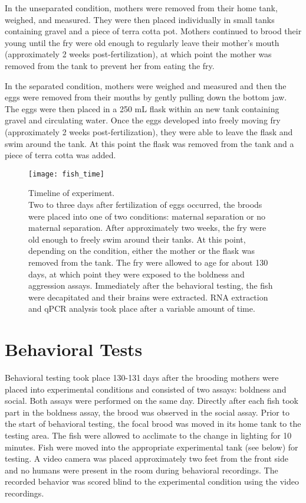 \documentclass[12pt,twoside]{reedthesis}
\begin{document}
In the unseparated condition, mothers were removed from their home tank,
weighed, and measured. They were then placed individually in small tanks containing gravel
and a piece of terra cotta pot. Mothers continued to brood their young until the
fry were old enough to regularly leave their mother's mouth (approximately 2 weeks post-fertilization), at which point the mother was removed from the tank to prevent her from eating the fry. 

In the separated condition, mothers were weighed and measured and then the eggs
were removed from their mouths by gently pulling down the bottom
jaw. The eggs were then placed in a 250 mL flask within an new tank containing
gravel and circulating water. Once
the eggs developed into freely moving fry (approximately 2 weeks
post-fertilization), they were able to leave the flask and swim around the tank.
At this point the flask was removed from the tank and a piece of terra cotta was added.

\begin{figure}[htbp] 
\begin{centering} 
\texttt{[image: fish\_time]}
\caption[Timeline of experiment]{\footnotesize{Timeline of experiment.\\ Two to
    three days after fertilization of eggs occurred, the broods were placed into
  one of two conditions: maternal separation or no maternal separation. After
  approximately two weeks, the fry were old enough to freely swim around their
  tanks. At this point, depending on the condition, either the mother or the
  flask was removed from the tank. The fry were allowed to age for about 130
  days, at which point they were exposed to the boldness and aggression assays.
  Immediately after the behavioral testing, the fish were decapitated and their
  brains were extracted. RNA extraction and qPCR analysis took place after a variable
  amount of time.}} 
\label{subd}
\end{centering} 
\end{figure}

\section{Behavioral Tests}

Behavioral testing took place 130-131 days after the brooding mothers were
placed into experimental conditions and consisted of two assays: boldness and social. Both assays were performed on the same day.
Directly after each fish took part in the boldness assay, the brood was observed in the
social assay.
Prior to the start of behavioral testing, the focal brood was moved in its home tank to the
testing area. The fish were allowed to acclimate to the change in lighting for 10
minutes. Fish were moved into the appropriate experimental tank (see below) for
testing. A video camera was placed approximately two
feet from the front side and no humans were present in the room during behavioral
recordings. The recorded behavior was scored blind to the experimental condition using the video recordings.
\end{document}
